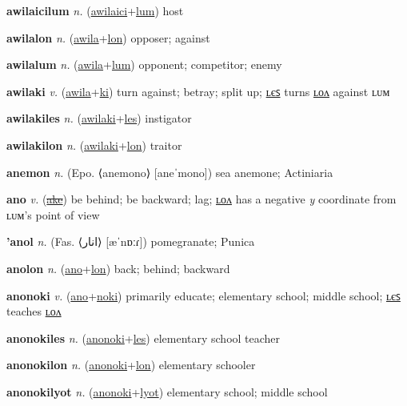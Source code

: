 \textbf{\hypertarget{awilaicilum}{awilaicilum}} \textit{n.} (\hyperlink{awilaici}{awilaici}+\allowbreak \hyperlink{lum}{lum})
host

\textbf{\hypertarget{awilalon}{awilalon}} \textit{n.} (\hyperlink{awila}{awila}+\allowbreak \hyperlink{lon}{lon})
opposer; against

\textbf{\hypertarget{awilalum}{awilalum}} \textit{n.} (\hyperlink{awila}{awila}+\allowbreak \hyperlink{lum}{lum})
opponent; competitor; enemy

\textbf{\hypertarget{awilaki}{awilaki}} \textit{v.} (\hyperlink{awila}{awila}+\allowbreak \hyperlink{ki}{ki})
turn against; betray; split up; \hyperlink{awilakiles}{ʟєꜱ} turns \hyperlink{awilakilon}{ʟᴏᴧ} against ʟᴜᴍ

\textbf{\hypertarget{awilakiles}{awilakiles}} \textit{n.} (\hyperlink{awilaki}{awilaki}+\allowbreak \hyperlink{les}{les})
instigator

\textbf{\hypertarget{awilakilon}{awilakilon}} \textit{n.} (\hyperlink{awilaki}{awilaki}+\allowbreak \hyperlink{lon}{lon})
traitor

\textbf{\hypertarget{anemon}{anemon}} \textit{n.} (Epo. ⟨anemono⟩ [aneˈmono])
sea anemone; Actiniaria

\textbf{\hypertarget{ano}{ano}} \textit{v.} (\hyperlink{ake}{\sout{ake}})
be behind; be backward; lag; \hyperlink{anolon}{ʟᴏᴧ} has a negative \textit{y} coordinate from ʟᴜᴍ’s point of view

\textbf{\hypertarget{'anol}{'anol}} \textit{n.} (Fas. ⟨{\arabics{}انار}⟩ [æˈnɒːɾ])
pomegranate; Punica

\textbf{\hypertarget{anolon}{anolon}} \textit{n.} (\hyperlink{ano}{ano}+\allowbreak \hyperlink{lon}{lon})
back; behind; backward

\textbf{\hypertarget{anonoki}{anonoki}} \textit{v.} (\hyperlink{ano}{ano}+\allowbreak \hyperlink{noki}{noki})
primarily educate; elementary school; middle school; \hyperlink{anonokiles}{ʟєꜱ} teaches \hyperlink{anonokilon}{ʟᴏᴧ}

\textbf{\hypertarget{anonokiles}{anonokiles}} \textit{n.} (\hyperlink{anonoki}{anonoki}+\allowbreak \hyperlink{les}{les})
elementary school teacher

\textbf{\hypertarget{anonokilon}{anonokilon}} \textit{n.} (\hyperlink{anonoki}{anonoki}+\allowbreak \hyperlink{lon}{lon})
elementary schooler

\textbf{\hypertarget{anonokilyot}{anonokilyot}} \textit{n.} (\hyperlink{anonoki}{anonoki}+\allowbreak \hyperlink{lyot}{lyot})
elementary school; middle school

